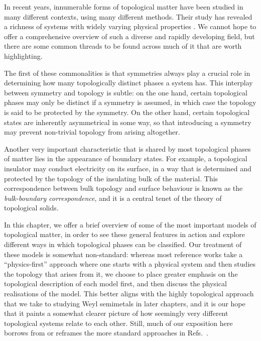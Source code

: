 \label{chap:topo-states}

In recent years, innumerable forms of topological matter have been studied in many different contexts, using many different methods. Their study has revealed a richness of systems with widely varying physical properties \cite{Akhmerov_online-course,Asboth_topo-course,Bernevig_topological-insulators,Sato_superconductors}. We cannot hope to offer a comprehensive overview of such a diverse and rapidly developing field, but there are some common threads to be found across much of it that are worth highlighting.

The first of these commonalities is that symmetries always play a crucial role in determining how many topologically distinct phases a system has. This interplay between symmetry and topology is subtle: on the one hand, certain topological phases may only be distinct if a symmetry is assumed, in which case the topology is said to be protected by the symmetry. %
On the other hand, certain topological states are inherently asymmetrical in some way, so that introducing a symmetry may prevent non-trivial topology from arising altogether. %

Another very important characteristic that is shared by most topological phases of matter lies in the appearance of boundary states. For example, a topological insulator may conduct electricity on its surface, in a way that is determined and protected by the topology of the insulating bulk of the material. This correspondence between bulk topology and surface behaviour is known as the \emph{bulk-boundary correspondence}, and it is a central tenet of the theory of topological solids.

In this chapter, we offer a brief overview of some of the most important models of topological matter, in order to see these general features in action and explore different ways in which topological phases can be classified. Our treatment of these models is somewhat non-standard: whereas most reference works take a ``physics-first'' approach where one starts with a physical system and then studies the topology that arises from it, we choose to place greater emphasis on the topological description of each model first, and then discuss the physical realisations of the model. This better aligns with the highly topological approach that we take to studying Weyl semimetals in later chapters, and it is our hope that it paints a somewhat clearer picture of how seemingly very different topological systems relate to each other. Still, much of our exposition here borrows from or reframes the more standard approaches in Refs.~\cite{Akhmerov_online-course,Asboth_topo-course,Bernevig_topological-insulators,Sato_superconductors}.

